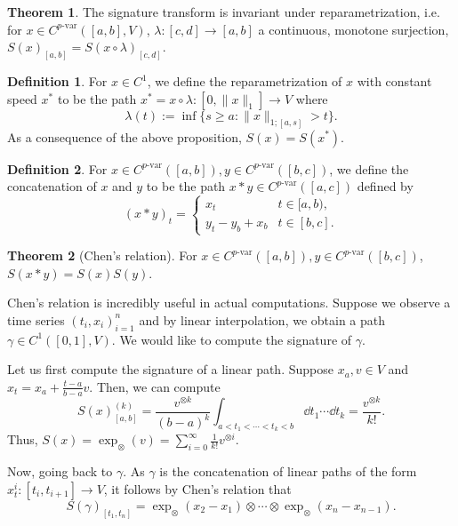 \documentclass[]{article}
\theoremstyle{definition}
\newtheorem{theorem}{Theorem}
\theoremstyle{definition}
\newtheorem{definition}{Definition}
\newcommand{\pvar}{{p\text{-var}}}
\begin{document}
\begin{theorem}
  The signature transform is invariant under reparametrization, i.e. for \(x \in C^\pvar([a, b], V)\), 
  \(\lambda : [c, d] \to [a, b]\) a continuous, monotone surjection, \(S(x)_{[a, b]} = S(x \circ \lambda)_{[c, d]}\).
\end{theorem}

\begin{definition}
  For \(x \in C^1\), we define the reparametrization of \(x\) with constant speed \(x^*\) to be the path 
  \(x^* = x \circ \lambda : [0, \|x\|_1] \to V\) where 
  \[\lambda(t) := \inf \{s \ge a: \|x\|_{1; [a, s]} > t\}.\]
  As a consequence of the above proposition, \(S(x) = S(x^*)\).
\end{definition}

\begin{definition}
  For \(x \in C^\pvar([a, b]), y \in C^\pvar([b, c])\), we define the concatenation of \(x\) and \(y\) to be
  the path \(x * y \in C^\pvar([a, c])\) defined by
  \[(x * y)_t = \begin{cases}
    x_t & t \in [a, b),\\
    y_t - y_b + x_b & t \in [b, c].
  \end{cases}\]
\end{definition}

\begin{theorem}[Chen's relation]
  For \(x \in C^\pvar([a, b]), y \in C^\pvar([b, c])\), \(S(x * y) = S(x)S(y)\).
\end{theorem}

Chen's relation is incredibly useful in actual computations. Suppose we observe a time series 
\({(t_i, x_i)}_{i = 1}^n\) and by linear interpolation, we obtain a path \(\gamma \in C^1([0, 1], V)\). 
We would like to compute the signature of \(\gamma\). 

Let us first compute the signature of a linear path. Suppose \(x_a, v \in V\) and 
\(x_t = x_a + \frac{t - a}{b - a}v\). Then, we can compute 
\[S(x)_{[a, b]}^{(k)} = \frac{v^{\otimes k}}{(b - a)^k} \int_{a < t_1 < \cdots < t_k < b} \dd t_1 \cdots \dd t_k 
  = \frac{v^{\otimes k}}{k!}.\]
Thus, \(S(x) = \exp_{\otimes}(v) = \sum_{i = 0}^\infty \frac{1}{k!}v^{\otimes i}\). 

Now, going back to \(\gamma\). As \(\gamma\) is the concatenation of linear paths of the form 
\(x_t^i : [t_i, t_{i + 1}] \to V\), it follows by Chen's relation that 
\[S(\gamma)_{[t_1, t_n]} = \exp_{\otimes}(x_2 - x_1) \otimes \cdots \otimes \exp_{\otimes}(x_n - x_{n - 1}).\]
\end{document}
